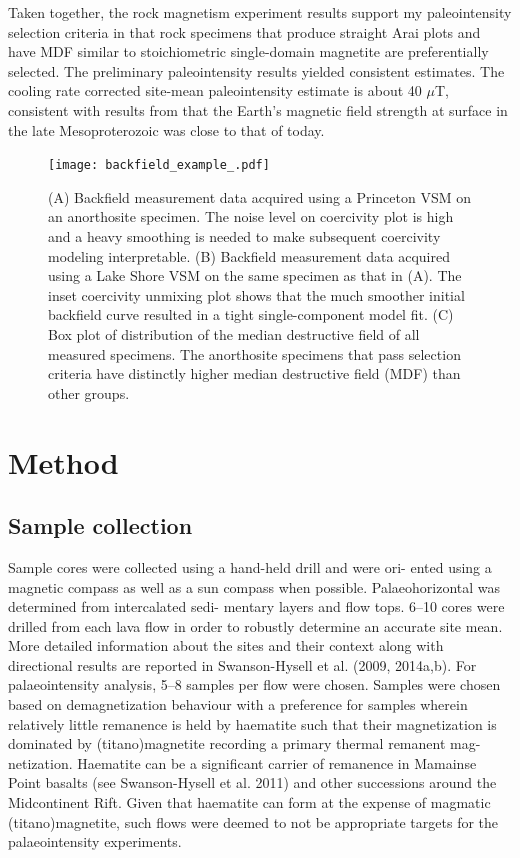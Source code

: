 \documentclass[draft]{agujournal2019}
\begin{document}
Taken together, the rock magnetism experiment results support my paleointensity selection criteria in that rock specimens that produce straight Arai plots and have MDF similar to stoichiometric single-domain magnetite are preferentially selected. The preliminary paleointensity results yielded consistent estimates. The cooling rate corrected site-mean paleointensity estimate is about 40 $\mu$T, consistent with results from \cite{Sprain2018a} that the Earth's magnetic field strength at surface in the late Mesoproterozoic was close to that of today. 

\begin{figure}
\begin{center}
	\noindent\texttt{[image: backfield\_example\_.pdf]}
\end{center}
\caption{\small{(A) Backfield measurement data acquired using a Princeton VSM on an anorthosite specimen. The noise level on coercivity plot is high and a heavy smoothing is needed to make subsequent coercivity modeling interpretable. (B) Backfield measurement data acquired using a Lake Shore VSM on the same specimen as that in (A). The inset coercivity unmixing plot shows that the much smoother initial backfield curve resulted in a tight single-component model fit. (C) Box plot of distribution of the median destructive field of all measured specimens. The anorthosite specimens that pass selection criteria have distinctly higher median destructive field (MDF) than other groups.}}
\label{fig:backfield}
\end{figure}










\section*{Method}
\subsection*{Sample collection}
Sample cores were collected using a hand-held drill and were ori- ented using a magnetic compass as well as a sun compass when possible. Palaeohorizontal was determined from intercalated sedi- mentary layers and flow tops. 6–10 cores were drilled from each lava flow in order to robustly determine an accurate site mean. More detailed information about the sites and their context along with directional results are reported in Swanson-Hysell et al. (2009, 2014a,b). For palaeointensity analysis, 5–8 samples per flow were chosen. Samples were chosen based on demagnetization behaviour with a preference for samples wherein relatively little remanence is held by haematite such that their magnetization is dominated by (titano)magnetite recording a primary thermal remanent mag- netization. Haematite can be a significant carrier of remanence in Mamainse Point basalts (see Swanson-Hysell et al. 2011) and other successions around the Midcontinent Rift. Given that haematite can form at the expense of magmatic (titano)magnetite, such flows were deemed to not be appropriate targets for the palaeointensity experiments.
\end{document}
